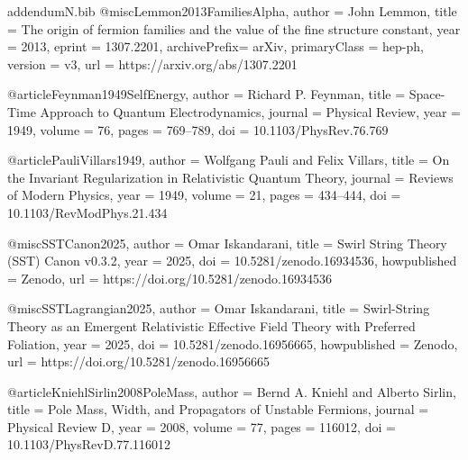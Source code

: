 \documentclass[11pt]{article}
\begin{document}
      \begin{filecontents*}{addendumN.bib}
      @misc{Lemmon2013FamiliesAlpha,
      author       = {John Lemmon},
      title        = {The origin of fermion families and the value of the fine structure constant},
      year         = {2013},
      eprint       = {1307.2201},
      archivePrefix= {arXiv},
      primaryClass = {hep-ph},
      version      = {v3},
      url          = {https://arxiv.org/abs/1307.2201}
      }

      @article{Feynman1949SelfEnergy,
      author  = {Richard P. Feynman},
      title   = {Space-Time Approach to Quantum Electrodynamics},
      journal = {Physical Review},
      year    = {1949},
      volume  = {76},
      pages   = {769--789},
      doi     = {10.1103/PhysRev.76.769}
      }

      @article{PauliVillars1949,
      author  = {Wolfgang Pauli and Felix Villars},
      title   = {On the Invariant Regularization in Relativistic Quantum Theory},
      journal = {Reviews of Modern Physics},
      year    = {1949},
      volume  = {21},
      pages   = {434--444},
      doi     = {10.1103/RevModPhys.21.434}
      }

      @misc{SSTCanon2025,
      author       = {Omar Iskandarani},
      title        = {Swirl String Theory (SST) Canon v0.3.2},
      year         = {2025},
      doi          = {10.5281/zenodo.16934536},
      howpublished = {Zenodo},
      url          = {https://doi.org/10.5281/zenodo.16934536}
      }

      @misc{SSTLagrangian2025,
      author       = {Omar Iskandarani},
      title        = {Swirl-String Theory as an Emergent Relativistic Effective Field Theory with Preferred Foliation},
      year         = {2025},
      doi          = {10.5281/zenodo.16956665},
      howpublished = {Zenodo},
      url          = {https://doi.org/10.5281/zenodo.16956665}
      }

      @article{KniehlSirlin2008PoleMass,
      author  = {Bernd A. Kniehl and Alberto Sirlin},
      title   = {Pole Mass, Width, and Propagators of Unstable Fermions},
      journal = {Physical Review D},
      year    = {2008},
      volume  = {77},
      pages   = {116012},
      doi     = {10.1103/PhysRevD.77.116012}
      }
      \end{filecontents*}
\end{document}
